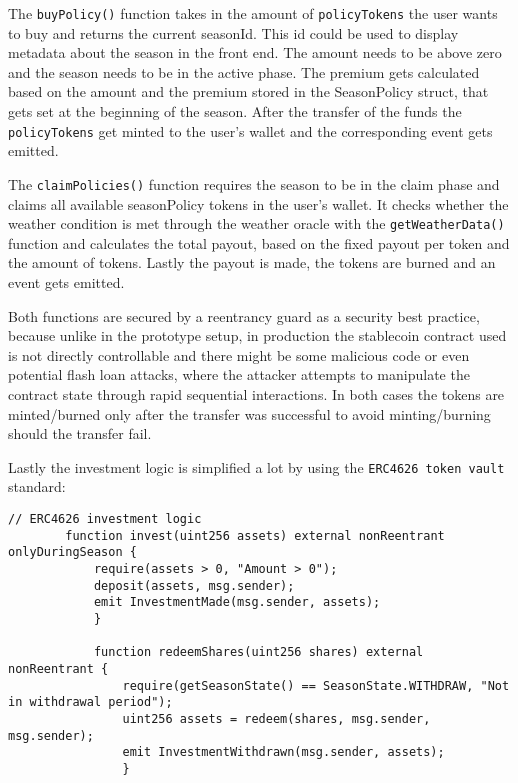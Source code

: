 \documentclass[11pt,a4paper]{article}
\begin{document}
		The \texttt{buyPolicy()} function takes in the amount of \texttt{policyTokens} the user wants to buy and returns the current seasonId.
		This id could be used to display metadata about the season in the front end.
		The amount needs to be above zero and the season needs to be in the active phase.
		The premium gets calculated based on the amount and the premium stored in the SeasonPolicy struct, that gets set at the beginning of the season.
		After the transfer of the funds the \texttt{policyTokens} get minted to the user's wallet and the corresponding event gets emitted.

		The \texttt{claimPolicies()} function requires the season to be in the claim phase and claims all available seasonPolicy tokens in the user's wallet.
		It checks whether the weather condition is met through the weather oracle with the \texttt{getWeatherData()} function and calculates the total payout, based on the fixed payout per token and the amount of tokens.
		Lastly the payout is made, the tokens are burned and an event gets emitted.

		Both functions are secured by a reentrancy guard as a security best practice, because unlike in the prototype setup, in production the stablecoin contract used is not directly controllable and there might be some malicious code or even potential flash loan attacks, where the attacker attempts to manipulate the contract state through rapid sequential interactions.
		In both cases the tokens are minted/burned only after the transfer was successful to avoid minting/burning should the transfer fail.

        \bigskip

		Lastly the investment logic is simplified a lot by using the \texttt{ERC4626 token vault} standard:

		\begin{lstlisting}[style=soliditystyle, caption={Excerpt: RainyDayFund.sol - Investor Functions},label={lst:contract-invest}]
		// ERC4626 investment logic
		function invest(uint256 assets) external nonReentrant onlyDuringSeason {
			require(assets > 0, "Amount > 0");
			deposit(assets, msg.sender);
			emit InvestmentMade(msg.sender, assets);
			}

			function redeemShares(uint256 shares) external nonReentrant {
				require(getSeasonState() == SeasonState.WITHDRAW, "Not in withdrawal period");
				uint256 assets = redeem(shares, msg.sender, msg.sender);
				emit InvestmentWithdrawn(msg.sender, assets);
				}
		\end{lstlisting}
\end{document}
